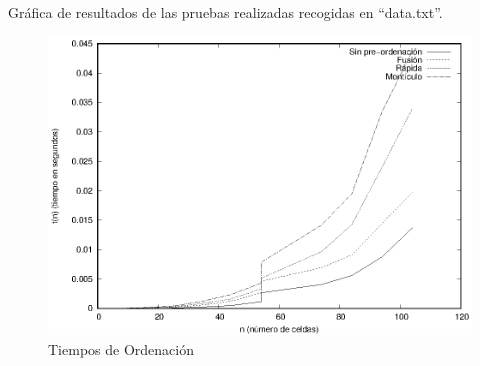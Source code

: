Gráfica de resultados de las pruebas realizadas recogidas en ``data.txt''.

\begin{figure}[h]
	\centering
	\includegraphics[width=0.7\linewidth]{./graphic.eps} %
	\caption{Tiempos de Ordenación}
	\label{fig:defenseValueCellsHead}
\end{figure}